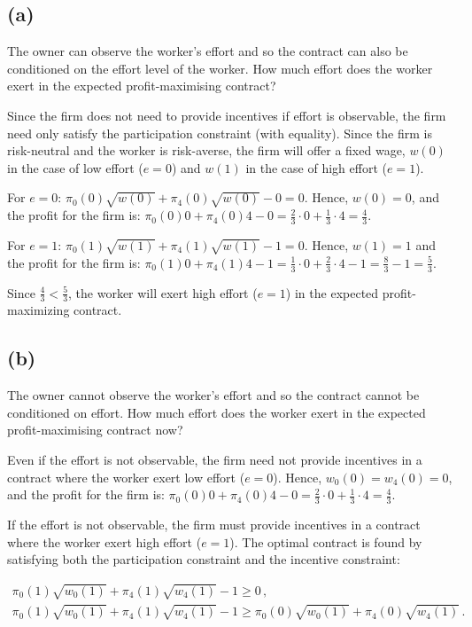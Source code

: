 \documentclass{article}
\begin{document}
\subsection*{(a)}The owner can observe the worker’s effort and so the contract can also be conditioned
on the effort level of the worker. How much effort does the worker exert in the expected
profit-maximising contract?

\bigskip

Since the firm does not need to provide incentives if effort is observable, the firm need only satisfy the participation constraint (with equality). Since the firm is risk-neutral and the worker is risk-averse, the firm will offer a fixed wage, $w(0)$ in the case of low effort ($e=0$) and $w(1)$ in the case of high effort ($e=1$).

For $e=0$: $\pi_0(0)\sqrt{w(0)} + \pi_4(0)\sqrt{w(0)} - 0 = 0$. Hence, $w(0) = 0$, and the profit for the firm is: $\pi_0(0)0 + \pi_4(0)4 - 0 = \tfrac23 \cdot 0 + \tfrac13 \cdot 4 = \tfrac43$.

For $e=1$: $\pi_0(1)\sqrt{w(1)} + \pi_4(1)\sqrt{w(1)} - 1 = 0$. Hence, $w(1) = 1$ and the profit for the firm is: $\pi_0(1)0 + \pi_4(1)4 - 1 = \tfrac13 \cdot 0 + \tfrac23 \cdot 4 - 1= \tfrac83 - 1 = \tfrac53$.

Since $\tfrac43 < \tfrac53$, the worker will exert high effort ($e=1$) in the expected profit-maximizing contract.

\subsection*{(b)}The owner cannot observe the worker’s effort and so the contract cannot be conditioned on
effort. How much effort does the worker exert in the expected profit-maximising contract now?

\bigskip

Even if the effort is not observable, the firm need not provide incentives in a contract where the worker exert low effort ($e=0$). Hence, $w_0(0) = w_4(0) = 0$, and the profit for the firm is: $\pi_0(0)0 + \pi_4(0)4 - 0 = \tfrac23 \cdot 0 + \tfrac13 \cdot 4 = \tfrac43$.

If the effort is not observable, the firm must provide incentives in a contract where the worker exert high effort ($e=1$). The optimal contract is found by satisfying both the participation constraint and the incentive constraint:

\begin{gather*}
  \pi_0(1)\sqrt{w_0(1)} + \pi_4(1)\sqrt{w_4(1)} - 1 \geq 0  \, ,\\
  \pi_0(1)\sqrt{w_0(1)} + \pi_4(1)\sqrt{w_4(1)} - 1 \geq \pi_0(0)\sqrt{w_0(1)} + \pi_4(0)\sqrt{w_4(1)} \, .
\end{gather*}
\end{document}
